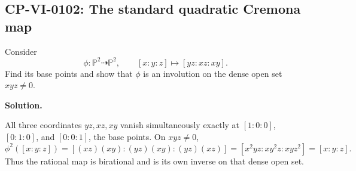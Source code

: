 
\subsection*{CP-VI-0102: The standard quadratic Cremona map}

Consider
\[
\phi:\mathbb P^2\dashrightarrow\mathbb P^2,
\qquad [x:y:z]\mapsto[yz:xz:xy].
\]
Find its base points and show that $\phi$ is an involution on the dense open set $xyz\ne0$.

\medskip
\noindent\textbf{Solution.}

All three coordinates $yz,xz,xy$ vanish simultaneously exactly at $[1:0:0]$, $[0:1:0]$, and $[0:0:1]$, the base points. On $xyz\ne0$,
\[
\phi^2([x:y:z])=[(xz)(xy):(yz)(xy):(yz)(xz)]
=[x^2yz:xy^2z:xyz^2]=[x:y:z].
\]
Thus the rational map is birational and is its own inverse on that dense open set.
